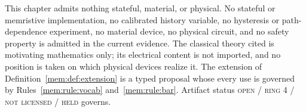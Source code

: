 \begin{boundary}\label{mem:bound:chapter}
This chapter admits nothing stateful, material, or physical. No stateful or memristive implementation, no calibrated history variable, no hysteresis or path-dependence experiment, no material device, no physical circuit, and no safety property is admitted in the current evidence. The classical theory cited \cite{chua71,chuakang76} is motivating mathematics only; its electrical content is not imported, and no position is taken on which physical devices realize it. The extension of Definition~\ref{mem:def:extension} is a typed proposal whose every use is governed by Rules~\ref{mem:rule:vocab} and~\ref{mem:rule:bar}. Artifact status \textsc{open / ring 4 / not licensed / held} governs.
\end{boundary}
